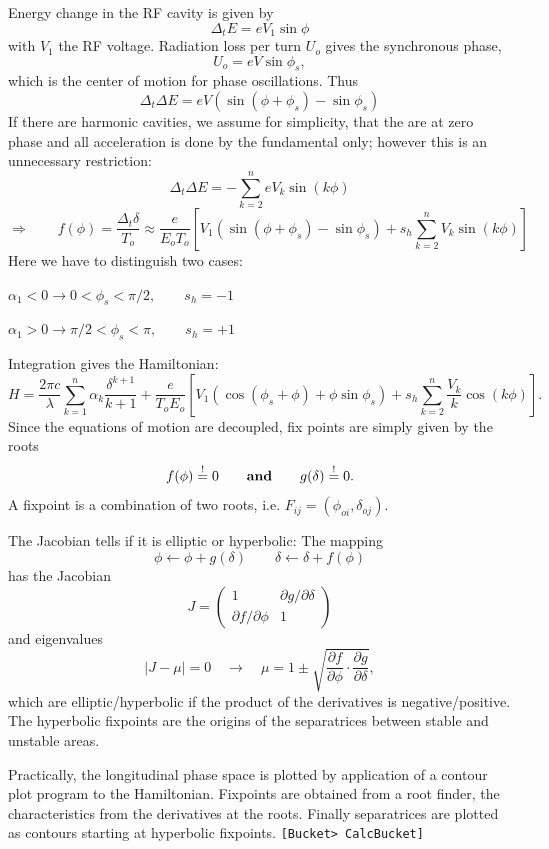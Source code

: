 \documentclass[12pt]{article}
\newcommand\beq{\begin{equation}}
\newcommand\eeq{\end{equation}}
\newcommand\code[1]{{\tt [#1]}}
\begin{document}
Energy change in the RF cavity is given by
\beq
\Delta_t E = eV_1 \sin\phi
\eeq
with $V_1$ the RF voltage. Radiation loss per turn $U_o$ gives the synchronous phase,
\beq
U_o = eV \sin \phi_s,
\eeq
which is the center of motion for phase oscillations. Thus
\beq
\Delta_t \Delta E = eV \left( \sin(\phi+\phi_s)-\sin\phi_s \right)
\eeq
If there are harmonic cavities, we assume for simplicity, that the are at zero phase and all acceleration is done by the fundamental only; however this is an unnecessary restriction:
\beq
\Delta_t \Delta E = - \sum_{k=2}^n eV_k \sin (k\phi)
\eeq
\beq
\Longrightarrow\qquad f(\phi)=\frac{\Delta_t \delta}{T_o} \approx \frac{e}{E_oT_o}\left[ V_1 \left( \sin(\phi+\phi_s)-\sin\phi_s \right)+s_h\sum_{k=2}^n V_k\sin(k \phi)\right]
\eeq
Here we have to distinguish two cases:

$\alpha_1 < 0 \longrightarrow 0< \phi_s < \pi/2, \qquad s_h=-1$

$\alpha_1 > 0 \longrightarrow \pi/2< \phi_s < \pi,\qquad s_h=+1$

Integration gives the Hamiltonian:
\beq
H = \frac{2\pi c}{\lambda} \sum_{k=1}^{n} \alpha_k\frac{\delta^{k+1}}{k+1} + \frac{e}{T_oE_o}\left[ V_1 \left(\cos(\phi_s+\phi)+\phi\sin\phi_s\right)+s_h\sum_{k=2}^n \frac{V_k}{k}\cos(k \phi)\right].
\eeq
Since the equations of motion are decoupled, fix points are simply given by the roots
\beq
f(\phi)\stackrel{!}{=}0\qquad \mbox{\bf and}\qquad g(\delta)\stackrel{!}{=}0.
\eeq
A fixpoint is a combination of two roots, i.e. $F_{ij}=(\phi_{oi}, \delta_{oj})$.

The Jacobian tells if it is elliptic or hyperbolic: The mapping
\beq
\phi \leftarrow \phi+g(\delta) \qquad \delta \leftarrow \delta +f(\phi)
\eeq
has the Jacobian
\beq
J = \left( \begin{array}{cc} 1 & \partial g/\partial \delta \\ \partial f/\partial\phi & 1 \end{array}\right)
\eeq
and eigenvalues
\beq
|J-\mu|=0\quad \longrightarrow \quad \mu=1\pm\sqrt{\frac{\partial f}{\partial \phi}\cdot \frac{\partial g}{\partial \delta}},
\eeq
which are elliptic/hyperbolic if the product of the derivatives is negative/positive.
The hyperbolic fixpoints are the origins of the separatrices between stable and unstable areas.

Practically, the longitudinal phase space is plotted by application of a contour plot program \cite{CONRECT} to the Hamiltonian. Fixpoints are obtained from a root finder, the characteristics from the derivatives at the roots. Finally separatrices are plotted as contours starting at hyperbolic fixpoints.
\code{Bucket> CalcBucket}
\end{document}
